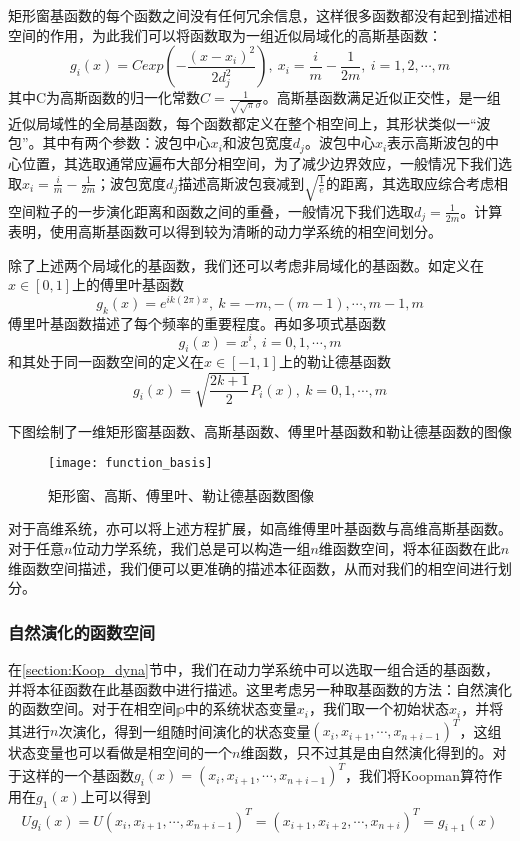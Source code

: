 矩形窗基函数的每个函数之间没有任何冗余信息，这样很多函数都没有起到描述相空间的作用，为此我们可以将函数取为一组近似局域化的高斯基函数：
\begin{equation}
    g_i(x)=Cexp\left(-\dfrac{(x-x_i)^2}{2d_j^2}\right), \ x_i=\frac{i}{m}-\frac{1}{2m},\ i=1,2,\cdots,m
\end{equation}
其中C为高斯函数的归一化常数$C=\frac{1}{\sqrt{\sqrt{\pi}\sigma}}$。高斯基函数满足近似正交性，是一组近似局域性的全局基函数，每个函数都定义在整个相空间上，其形状类似一“波包”。其中有两个参数：波包中心$x_i$和波包宽度$d_j$。波包中心$x_i$表示高斯波包的中心位置，其选取通常应遍布大部分相空间，为了减少边界效应，一般情况下我们选取$x_i=\frac{i}{m}-\frac{1}{2m}$；波包宽度$d_j$描述高斯波包衰减到$\sqrt{\frac{1}{e}}$的距离，其选取应综合考虑相空间粒子的一步演化距离和函数之间的重叠，一般情况下我们选取$d_j=\frac{1}{2m}$。计算表明，使用高斯基函数可以得到较为清晰的动力学系统的相空间划分。

除了上述两个局域化的基函数，我们还可以考虑非局域化的基函数。如定义在$x\in [0,1]$上的傅里叶基函数
\begin{equation}
    g_k(x)=e^{ik(2\pi)x},\ k=-m,-(m-1),\cdots,m-1,m
\end{equation}
傅里叶基函数描述了每个频率的重要程度。再如多项式基函数
\begin{equation}
    g_i(x)=x^i,\ i=0,1,\cdots,m
\end{equation}
和其处于同一函数空间的定义在$x\in [-1,1]$上的勒让德基函数
\begin{equation}
    g_i(x)=\sqrt{\dfrac{2k+1}{2}}P_i(x),\ k=0,1,\cdots,m
\end{equation}

下图绘制了一维矩形窗基函数、高斯基函数、傅里叶基函数和勒让德基函数的图像
\begin{figure}
	\centering
	\texttt{[image: function\_basis]}
    \caption{矩形窗、高斯、傅里叶、勒让德基函数图像}
    \label{fig:func_bas}
\end{figure}

对于高维系统，亦可以将上述方程扩展，如高维傅里叶基函数与高维高斯基函数。对于任意$n$位动力学系统，我们总是可以构造一组$n$维函数空间，将本征函数在此$n$维函数空间描述，我们便可以更准确的描述本征函数，从而对我们的相空间进行划分。

\subsubsection{自然演化的函数空间}

在\ref{section:Koop_dyna}节中，我们在动力学系统中可以选取一组合适的基函数，并将本征函数在此基函数中进行描述。这里考虑另一种取基函数的方法：自然演化的函数空间。对于在相空间$\mathbb{p}$中的系统状态变量$x_i$，我们取一个初始状态$x_i$，并将其进行$n$次演化，得到一组随时间演化的状态变量$(x_i,x_{i+1},\cdots,x_{n+i-1})^T$，这组状态变量也可以看做是相空间的一个$n$维函数，只不过其是由自然演化得到的。对于这样的一个基函数$g_i(x)=(x_i,x_{i+1},\cdots,x_{n+i-1})^T$，我们将Koopman算符作用在$g_1(x)$上可以得到
\begin{equation}
    Ug_i(x)=U(x_i,x_{i+1},\cdots,x_{n+i-1})^T=(x_{i+1},x_{i+2},\cdots,x_{n+i})^T=g_{i+1}(x)
\end{equation}

